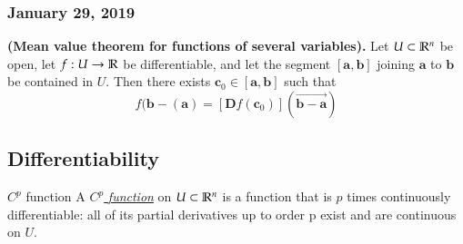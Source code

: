 \subsubsection*{January 29, 2019}

\begin{theorem}
  \textbf{(Mean value theorem for functions of several variables).} Let $U \subset \mathbb{R}^n$ be open, let $f : U \to \mathbb{R}$ be differentiable, and let the segment $[\bm{a},\bm{b}]$ joining $\bm{a}$ to $\bm{b}$ be contained in $U$. Then there exists $\bm{c}_0\in [\bm{a},\bm{b}]$ such that
  \begin{equation}
  	f(\bm{b}-(\bm{a})= [\bm{D}f(\bm{c}_0)](\vec{\bm{b}-\bm{a}})
  \end{equation}
\end{theorem}

\subsection{Differentiability}

\begin{defn}{$C^p$ function}
A \ul{$C^p$ \emph{function}} on $U\subset \mathbb{R}^n$ is a function that is $p$ times continuously differentiable: all of its partial derivatives up to order p exist and are continuous on $U$.
\end{defn}

